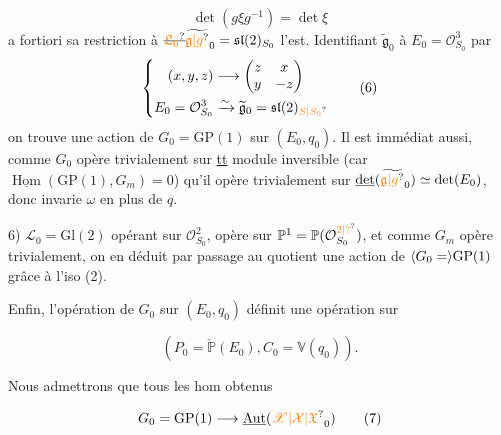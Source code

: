 \[
 \det(g\xi g^{-1})=\det\xi\tag*{(5)}
\]
a fortiori sa restriction à $\deleted{\unsure{\mathfrak L_0}}\widetilde{\unsure{\mathfrak g|g}}_0=\mathfrak{sl}(2)_{S_0}$ l'est. Identifiant $\widetilde{\mathfrak g}_0$ à $E_0=\mathcal O_{S_0}^3$ par
\[
 \left\{\begin{aligned}
 (x,y,z)&\longrightarrow\begin{pmatrix}z&x\\y&-z\end{pmatrix}\\
 E_0=\mathcal O_{S_0}^3&\xrightarrow{\sim}\widetilde{\mathfrak g}_0=\mathfrak{sl}(2)_{\unsure{S|S_0}}
 \end{aligned}\right.\tag*{(6)}
\]
on trouve une action de $G_0=\mathrm{GP}(1)$ sur $(E_0,q_0)$. Il est immédiat
aussi, comme $G_0$ opère trivialement sur \uline{tt} module inversible (car $\underline{\operatorname{Hom}}(\mathrm{GP}(1),G_m)=0$) qu'il opère trivialement sur $\underline{\det}(\widetilde{\unsure{\mathfrak g|g}}_0)\simeq\det(E_0)$, donc invarie $\omega$ en plus de $q$.

6) $\mathscr L_0=\mathrm{Gl}(2)$ opérant sur $\mathcal O_{S_0}^2$, opère sur $\mathbb P^1=\mathbb P(\mathcal O_{S_0}^{\unsure{2|?}})$, et comme $G_m$ opère trivialement, on en déduit par passage au quotient une action de $\inserted{G_0=}\mathrm{GP}(1)$ grâce à l'iso (2).

Enfin, l'opération de $G_0$ sur $(E_0,q_0)$ définit une opération sur

\[
(P_0=\check{\mathbb P}(E_0), C_0=\mathbb V(q_0)).
\]
\noindent\hspace*{.24\linewidth}

Nous admettrons  que tous les hom obtenus


\[
G_0=\mathrm{GP}(1)\longrightarrow\underline{\operatorname{Aut}}(\unsure{\mathscr X|\mathcal X|\mathfrak X}_0)\tag*{(7)}
\]

